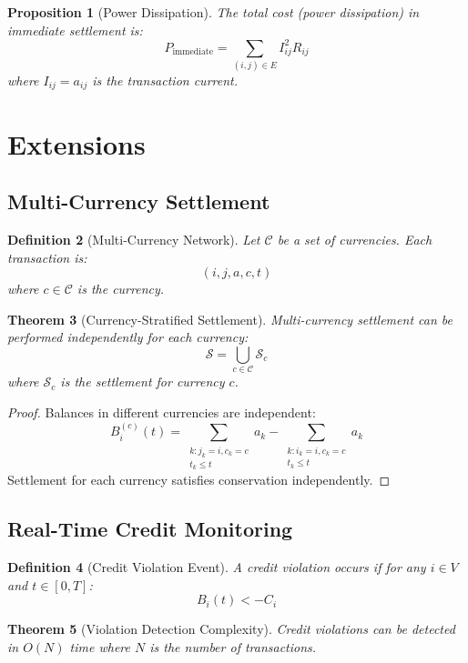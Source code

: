 \documentclass[12pt]{article}
\newtheorem{theorem}{Theorem}
\newtheorem{definition}[theorem]{Definition}
\newtheorem{proposition}[theorem]{Proposition}
\begin{document}
\begin{proposition}[Power Dissipation]
The total cost (power dissipation) in immediate settlement is:
$$
P_{\text{immediate}} = \sum_{(i,j) \in E} I_{ij}^2 R_{ij}
$$
where $I_{ij} = a_{ij}$ is the transaction current.
\end{proposition}

\section{Extensions}

\subsection{Multi-Currency Settlement}

\begin{definition}[Multi-Currency Network]
Let $\mathcal{C}$ be a set of currencies. Each transaction is:
$$
(i, j, a, c, t)
$$
where $c \in \mathcal{C}$ is the currency.
\end{definition}

\begin{theorem}[Currency-Stratified Settlement]
Multi-currency settlement can be performed independently for each currency:
$$
\mathcal{S} = \bigcup_{c \in \mathcal{C}} \mathcal{S}_c
$$
where $\mathcal{S}_c$ is the settlement for currency $c$.
\end{theorem}

\begin{proof}
Balances in different currencies are independent:
$$
B_i^{(c)}(t) = \sum_{\substack{k : j_k=i, c_k=c \\ t_k \leq t}} a_k - \sum_{\substack{k : i_k=i, c_k=c \\ t_k \leq t}} a_k
$$
Settlement for each currency satisfies conservation independently.
\end{proof}

\subsection{Real-Time Credit Monitoring}

\begin{definition}[Credit Violation Event]
A credit violation occurs if for any $i \in V$ and $t \in [0,T]$:
$$
B_i(t) < -C_i
$$
\end{definition}

\begin{theorem}[Violation Detection Complexity]
Credit violations can be detected in $O(N)$ time where $N$ is the number of transactions.
\end{theorem}
\end{document}
